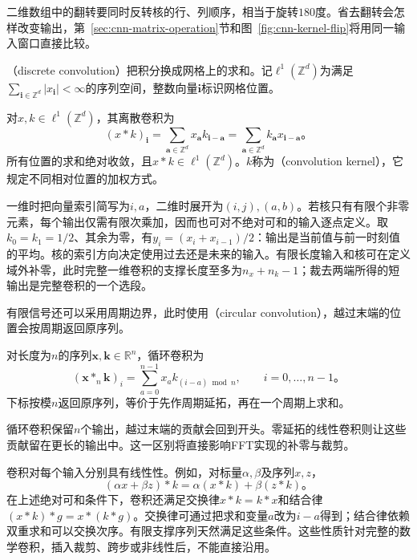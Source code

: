 二维数组中的翻转要同时反转核的行、列顺序，相当于旋转$180$度。省去翻转会怎样改变输出，第~\ref{sec:cnn-matrix-operation}节和图~\ref{fig:cnn-kernel-flip}将用同一输入窗口直接比较。

（discrete convolution）把积分换成网格上的求和。记$\ell^1(\mathbb Z^d)$为满足$\sum_{\bm i\in\mathbb Z^d}|x_{\bm i}|<\infty$的序列空间，整数向量$\bm i$标识网格位置。

\begin{definition}[离散卷积]
  \label{def:cnn-discrete-convolution}
  对$x,k\in\ell^1(\mathbb Z^d)$，其离散卷积为
  \begin{equation}
    (x*k)_{\bm i}=\sum_{\bm a\in\mathbb Z^d}
       x_{\bm a}k_{\bm i-\bm a}
      =\sum_{\bm a\in\mathbb Z^d}k_{\bm a}x_{\bm i-\bm a}\text{。}
    \label{eq:cnn-discrete-convolution}
  \end{equation}
  所有位置的求和绝对收敛，且$x*k\in\ell^1(\mathbb Z^d)$。$k$称为（convolution kernel），它规定不同相对位置的加权方式。
\end{definition}

一维时把向量索引简写为$i,a$，二维时展开为$(i,j),(a,b)$。若核只有有限个非零元素，每个输出仅需有限次乘加，因而也可对不绝对可和的输入逐点定义。取$k_0=k_1=1/2$、其余为零，有$y_i=(x_i+x_{i-1})/2$：输出是当前值与前一时刻值的平均。核的索引方向决定使用过去还是未来的输入。有限长度输入和核可在定义域外补零，此时完整一维卷积的支撑长度至多为$n_x+n_k-1$；裁去两端所得的短输出是完整卷积的一个选段。

有限信号还可以采用周期边界，此时使用（circular convolution），越过末端的位置会按周期返回原序列。
\begin{definition}[循环卷积]
  \label{def:cnn-circular-convolution}
  对长度为$n$的序列$\bm x,\bm k\in\mathbb R^n$，循环卷积为
  \begin{equation}
    (\bm x*_n\bm k)_i=\sum_{a=0}^{n-1}
      x_a k_{(i-a)\bmod n},\qquad i=0,\ldots,n-1\text{。}
    \label{eq:cnn-circular-convolution}
  \end{equation}
  下标按模$n$返回原序列，等价于先作周期延拓，再在一个周期上求和。
\end{definition}
循环卷积保留$n$个输出，越过末端的贡献会回到开头。零延拓的线性卷积则让这些贡献留在更长的输出中。这一区别将直接影响FFT实现的补零与裁剪。

卷积对每个输入分别具有线性性。例如，对标量$\alpha,\beta$及序列$x,z$，
\begin{equation}
  (\alpha x+\beta z)*k=\alpha(x*k)+\beta(z*k)\text{。}
  \label{eq:cnn-convolution-linearity}
\end{equation}
在上述绝对可和条件下，卷积还满足交换律$x*k=k*x$和结合律$(x*k)*g=x*(k*g)$。交换律可通过把求和变量$a$改为$i-a$得到；结合律依赖双重求和可以交换次序。有限支撑序列天然满足这些条件。这些性质针对完整的数学卷积，插入裁剪、跨步或非线性后，不能直接沿用。

